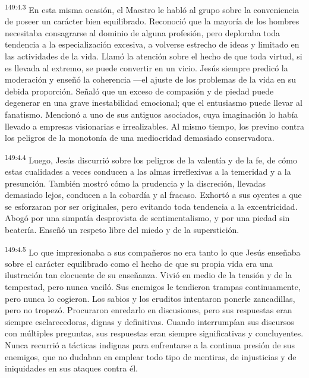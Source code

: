 \par 
\textsuperscript{149:4.3} En esta misma ocasión, el Maestro le habló al grupo sobre la conveniencia de poseer un carácter bien equilibrado. Reconoció que la mayoría de los hombres necesitaba consagrarse al dominio de alguna profesión, pero deploraba toda tendencia a la especialización excesiva, a volverse estrecho de ideas y limitado en las actividades de la vida. Llamó la atención sobre el hecho de que toda virtud, si es llevada al extremo, se puede convertir en un vicio. Jesús siempre predicó la moderación y enseñó la coherencia ---el ajuste de los problemas de la vida en su debida proporción. Señaló que un exceso de compasión y de piedad puede degenerar en una grave inestabilidad emocional; que el entusiasmo puede llevar al fanatismo. Mencionó a uno de sus antiguos asociados, cuya imaginación lo había llevado a empresas visionarias e irrealizables. Al mismo tiempo, los previno contra los peligros de la monotonía de una mediocridad demasiado conservadora.

\par 
\textsuperscript{149:4.4} Luego, Jesús discurrió sobre los peligros de la valentía y de la fe, de cómo estas cualidades a veces conducen a las almas irreflexivas a la temeridad y a la presunción. También mostró cómo la prudencia y la discreción, llevadas demasiado lejos, conducen a la cobardía y al fracaso. Exhortó a sus oyentes a que se esforzaran por ser originales, pero evitando toda tendencia a la excentricidad. Abogó por una simpatía desprovista de sentimentalismo, y por una piedad sin beatería. Enseñó un respeto libre del miedo y de la superstición.

\par 
\textsuperscript{149:4.5} Lo que impresionaba a sus compañeros no era tanto lo que Jesús enseñaba sobre el carácter equilibrado como el hecho de que su propia vida era una ilustración tan elocuente de su enseñanza. Vivió en medio de la tensión y de la tempestad, pero nunca vaciló. Sus enemigos le tendieron trampas continuamente, pero nunca lo cogieron. Los sabios y los eruditos intentaron ponerle zancadillas, pero no tropezó. Procuraron enredarlo en discusiones, pero sus respuestas eran siempre esclarecedoras, dignas y definitivas. Cuando interrumpían sus discursos con múltiples preguntas, sus respuestas eran siempre significativas y concluyentes. Nunca recurrió a tácticas indignas para enfrentarse a la continua presión de sus enemigos, que no dudaban en emplear todo tipo de mentiras, de injusticias y de iniquidades en sus ataques contra él.

